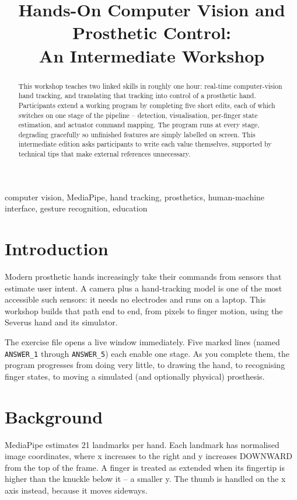 \documentclass[conference]{IEEEtran}
\begin{document}
\title{Hands-On Computer Vision and Prosthetic Control:\\ An Intermediate Workshop}
\author{
}
\maketitle

\begin{abstract}
This workshop teaches two linked skills in roughly one hour: real-time computer-vision hand tracking, and translating that tracking into control of a prosthetic hand. Participants extend a working program by completing five short edits, each of which switches on one stage of the pipeline -- detection, visualisation, per-finger state estimation, and actuator command mapping. The program runs at every stage, degrading gracefully so unfinished features are simply labelled on screen. This intermediate edition asks participants to write each value themselves, supported by technical tips that make external references unnecessary.
\end{abstract}

\begin{IEEEkeywords}
computer vision, MediaPipe, hand tracking, prosthetics, human-machine interface, gesture recognition, education
\end{IEEEkeywords}

\section{Introduction}
Modern prosthetic hands increasingly take their commands from sensors that estimate user intent. A camera plus a hand-tracking model is one of the most accessible such sensors: it needs no electrodes and runs on a laptop. This workshop builds that path end to end, from pixels to finger motion, using the Severus hand and its simulator.

The exercise file opens a live window immediately. Five marked lines (named \lstinline!ANSWER_1! through \lstinline!ANSWER_5!) each enable one stage. As you complete them, the program progresses from doing very little, to drawing the hand, to recognising finger states, to moving a simulated (and optionally physical) prosthesis.

\section{Background}
MediaPipe estimates 21 landmarks per hand. Each landmark has normalised image coordinates, where x increases to the right and y increases DOWNWARD from the top of the frame. A finger is treated as extended when its fingertip is higher than the knuckle below it -- a smaller y. The thumb is handled on the x axis instead, because it moves sideways.
\end{document}

